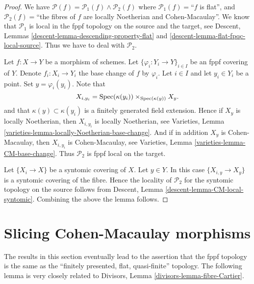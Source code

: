 \begin{proof}
We have
$\mathcal{P}(f) =
\mathcal{P}_1(f) \wedge \mathcal{P}_2(f)$
where
$\mathcal{P}_1(f)=$``$f$ is flat'', and
$\mathcal{P}_2(f)=$``the fibres of $f$ are locally Noetherian
and Cohen-Macaulay''.
We know that $\mathcal{P}_1$ is
local in the fppf topology on the source and the target, see
Descent, Lemmas \ref{descent-lemma-descending-property-flat} and
\ref{descent-lemma-flat-fpqc-local-source}. Thus we have to deal
with $\mathcal{P}_2$.

\medskip\noindent
Let $f : X \to Y$ be a morphism of schemes.
Let $\{\varphi_i : Y_i \to Y\}_{i \in I}$ be an fppf covering of $Y$.
Denote $f_i : X_i \to Y_i$ the base change of $f$ by $\varphi_i$.
Let $i \in I$ and let $y_i \in Y_i$ be a point.
Set $y = \varphi_i(y_i)$. Note that
$$
X_{i, y_i} = \mathop{\rm Spec}(\kappa(y_i)) \times_{\mathop{\rm Spec}(\kappa(y))} X_y.
$$
and that $\kappa(y) \subset \kappa(y_i)$ is a finitely generated field
extension. Hence if $X_y$ is locally Noetherian, then
$X_{i, y_i}$ is locally Noetherian, see
Varieties, Lemma \ref{varieties-lemma-locally-Noetherian-base-change}.
And if in addition $X_y$ is Cohen-Macaulay,
then $X_{i, y_i}$ is Cohen-Macaulay, see
Varieties, Lemma \ref{varieties-lemma-CM-base-change}.
Thus $\mathcal{P}_2$ is fppf local on the target.

\medskip\noindent
Let $\{X_i \to X\}$ be a syntomic covering of $X$.
Let $y \in Y$. In this case $\{X_{i, y} \to X_y\}$ is a
syntomic covering of the fibre. Hence the locality of $\mathcal{P}_2$
for the syntomic topology on the source follows from
Descent, Lemma \ref{descent-lemma-CM-local-syntomic}.
Combining the above the lemma follows.
\end{proof}






\section{Slicing Cohen-Macaulay morphisms}
\label{section-slicing-CM}

\noindent
The results in this section eventually lead to the assertion that
the fppf topology is the same as the
``finitely presented, flat, quasi-finite'' topology.
The following lemma is very closely related to
Divisors, Lemma \ref{divisors-lemma-fibre-Cartier}.

